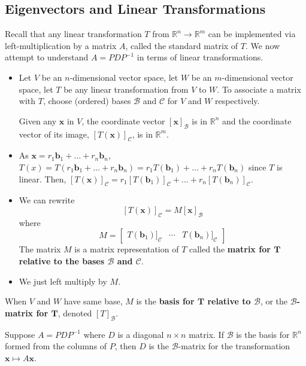 \documentclass[11pt]{scrartcl}
\theoremstyle{dotlessP}
\theoremstyle{dotlessN}
\newcommand{\reals}{\mathbb{R}} %
\newcommand{\basis}{\mathcal{B}}
\begin{document}
\subsection{Eigenvectors and Linear Transformations}
\begin{remark}
	Recall that any linear transformation $T$ from $\reals^n \to \reals^m$ can be implemented via left-multiplication by a matrix $A$, called the standard matrix of $T$. We now attempt to understand $A = PDP^{-1}$ in terms of linear transformations.
\end{remark}
\begin{itemize}
	\item Let $V$ be an $n$-dimensional vector space, let $W$ be an $m$-dimensional vector space, let $T$ be any linear transformation from $V$ to $W$. To associate a matrix with  $T$, choose (ordered) bases $\basis$ and $\mathcal{C}$ for $V$ and $W$ respectively.

		Given any $\bm{x}$ in $V$, the coordinate vector $[\bm{x}]_\basis$ is in $\reals^n$ and the coordinate vector of its image, $[T(\bm{x})]_\mathcal{C}$, is in $\reals^m$.
	\item As $\bm{x} = r_1\bm{b}_1 + \dots + r_n \bm{b}_n$, $T(x) = T(r_1\bm{b}_1 + \dots + r_n \bm{b}_n)= r_1T(\bm{b}_1) + \dots + r_n T(\bm{b}_n)$ since $T$ is linear. Then, $[T(\bm{x})]_\mathcal{C} = r_1[T(\bm{b}_1)]_\mathcal{C} + \dots + r_n [T(\bm{b}_n)]_\mathcal{C}$.
	\item We can rewrite 
		\[
			[T(\bm{x})]_\mathcal{C} = M[\bm{x}]_\basis
		\] 
		where
		\[
			M = 
			\begin{bmatrix}
			T(\bm{b}_1)]_\mathcal{C} & \cdots & T(\bm{b}_n)]_\mathcal{C}
			\end{bmatrix}
		\] 
		The matrix $M$ is a matrix representation of $T$ called the \textbf{matrix for $\bm{T}$ relative to the bases  $\bm{\basis}$ and  $\bm{\mathcal{C}}$}.
	\item We just left multiply by $M$.
\end{itemize}
		\begin{definition}
	When $V$ and $W$ have same base, $M$ is the \textbf{basis for $\bm{T}$ relative to  $\bm{\basis}$}, or the \textbf{$\bm{\basis}$-matrix for  $\bm{T}$}, denoted $[T]_\basis$.
		\end{definition}
\begin{theorem}
	Suppose $A = PDP^{-1}$ where  $D$ is a diagonal $n \times n$ matrix. If  $\basis$ is the basis for  $\reals^n$ formed from the columns of $P$, then $D$ is the $\basis$-matrix for the transformation  $\bm{x} \mapsto A\bm{x}$.
\end{theorem}
\end{document}
